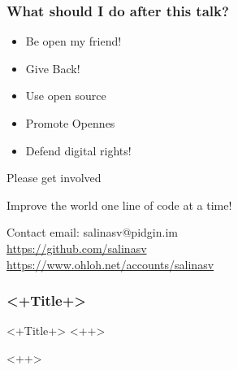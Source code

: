 \documentclass[hyperref={pdfpagelabels=false},xcolor=pst,pdf,fragile]{beamer}
\begin{document}
\begin{frame}
  \frametitle{What should I do after this talk?}

	  \begin{itemize}
		  \item Be open my friend!
			  \pause
		  \item Give Back!
			  \pause
		  \item Use open source
			  \pause
		  \item Promote Opennes
			  \pause
		  \item \alert{Defend digital rights!}
	  \end{itemize}

  \pause
  \begin{alertblock}{\begin{center}Please get involved\end{center}}
	  \begin{center}
		  Improve the world one line of code at a time!
	  \end{center}
  \end{alertblock}

  \pause
  \begin{block}{Contact}
	  email: salinasv@pidgin.im \\
	  \url{https://github.com/salinasv} \\
	  \url{https://www.ohloh.net/accounts/salinasv}
  \end{block}

\end{frame}

\begin{frame}
  \frametitle{<+Title+>}

  \begin{block}{<+Title+>} %
    <++>
  \end{block}

\end{frame}

<++>
\end{document}
